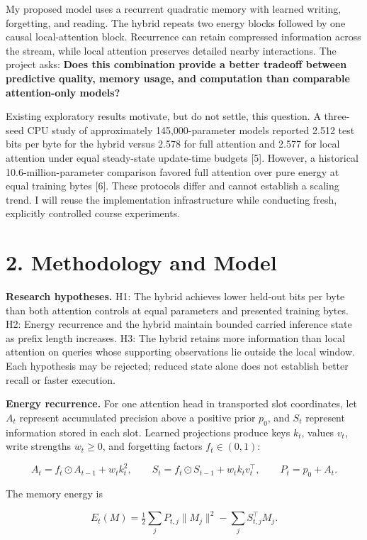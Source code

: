 \documentclass[11pt,letterpaper]{article}
\begin{document}
My proposed model uses a recurrent quadratic memory with learned writing, forgetting, and reading. The hybrid repeats two energy blocks followed by one causal local-attention block. Recurrence can retain compressed information across the stream, while local attention preserves detailed nearby interactions. The project asks: \textbf{Does this combination provide a better tradeoff between predictive quality, memory usage, and computation than comparable attention-only models?}

Existing exploratory results motivate, but do not settle, this question. A three-seed CPU study of approximately 145,000-parameter models reported 2.512 test bits per byte for the hybrid versus 2.578 for full attention and 2.577 for local attention under equal steady-state update-time budgets [5]. However, a historical 10.6-million-parameter comparison favored full attention over pure energy at equal training bytes [6]. These protocols differ and cannot establish a scaling trend. I will reuse the implementation infrastructure while conducting fresh, explicitly controlled course experiments.

\newpage
\section*{2. Methodology and Model}

\textbf{Research hypotheses.} H1: The hybrid achieves lower held-out bits per byte than both attention controls at equal parameters and presented training bytes. H2: Energy recurrence and the hybrid maintain bounded carried inference state as prefix length increases. H3: The hybrid retains more information than local attention on queries whose supporting observations lie outside the local window. Each hypothesis may be rejected; reduced state alone does not establish better recall or faster execution.

\textbf{Energy recurrence.} For one attention head in transported slot coordinates, let \(A_t\) represent accumulated precision above a positive prior \(p_0\), and \(S_t\) represent information stored in each slot. Learned projections produce keys \(k_t\), values \(v_t\), write strengths \(w_t\geq0\), and forgetting factors \(f_t\in(0,1)\):

\[
A_t=f_t\odot A_{t-1}+w_t k_t^2,\qquad
S_t=f_t\odot S_{t-1}+w_t k_t v_t^\top,\qquad
P_t=p_0+A_t.
\]

The memory energy is

\[
E_t(M)=\tfrac12\sum_j P_{t,j}\|M_j\|^2-\sum_j S_{t,j}^{\top}M_j.
\]
\end{document}
